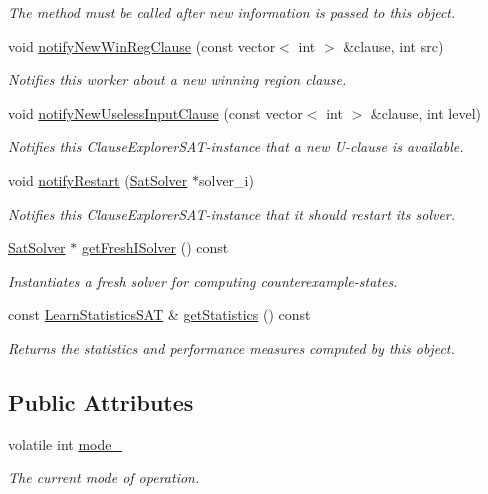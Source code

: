 \begin{DoxyCompactItemize}
\begin{DoxyCompactList}\small\item\em The method must be called after new information is passed to this object. \end{DoxyCompactList}\item 
void \hyperlink{classClauseExplorerSAT_ad507ce2b3b33e0e5b27237fd24954d82}{notify\-New\-Win\-Reg\-Clause} (const vector$<$ int $>$ \&clause, int src)
\begin{DoxyCompactList}\small\item\em Notifies this worker about a new winning region clause. \end{DoxyCompactList}\item 
void \hyperlink{classClauseExplorerSAT_a1898760d3aec582ffbd0c5dc5460f8f9}{notify\-New\-Useless\-Input\-Clause} (const vector$<$ int $>$ \&clause, int level)
\begin{DoxyCompactList}\small\item\em Notifies this Clause\-Explorer\-S\-A\-T-\/instance that a new U-\/clause is available. \end{DoxyCompactList}\item 
void \hyperlink{classClauseExplorerSAT_ac52d59bcc5134d36683aab18de06d782}{notify\-Restart} (\hyperlink{classSatSolver}{Sat\-Solver} $\ast$solver\-\_\-i)
\begin{DoxyCompactList}\small\item\em Notifies this Clause\-Explorer\-S\-A\-T-\/instance that it should restart its solver. \end{DoxyCompactList}\item 
\hyperlink{classSatSolver}{Sat\-Solver} $\ast$ \hyperlink{classClauseExplorerSAT_a62a9c66613cc63348722c7c880ce84f0}{get\-Fresh\-I\-Solver} () const 
\begin{DoxyCompactList}\small\item\em Instantiates a fresh solver for computing counterexample-\/states. \end{DoxyCompactList}\item 
const \hyperlink{classLearnStatisticsSAT}{Learn\-Statistics\-S\-A\-T} \& \hyperlink{classClauseExplorerSAT_a9798ab0d723cc896feef36e2fbf5311a}{get\-Statistics} () const 
\begin{DoxyCompactList}\small\item\em Returns the statistics and performance measures computed by this object. \end{DoxyCompactList}\end{DoxyCompactItemize}
\subsection*{Public Attributes}
\begin{DoxyCompactItemize}
\item 
volatile int \hyperlink{classClauseExplorerSAT_a974855f554c6016fa7dd291afd76baa4}{mode\-\_\-}
\begin{DoxyCompactList}\small\item\em The current mode of operation. \end{DoxyCompactList}\end{DoxyCompactItemize}
